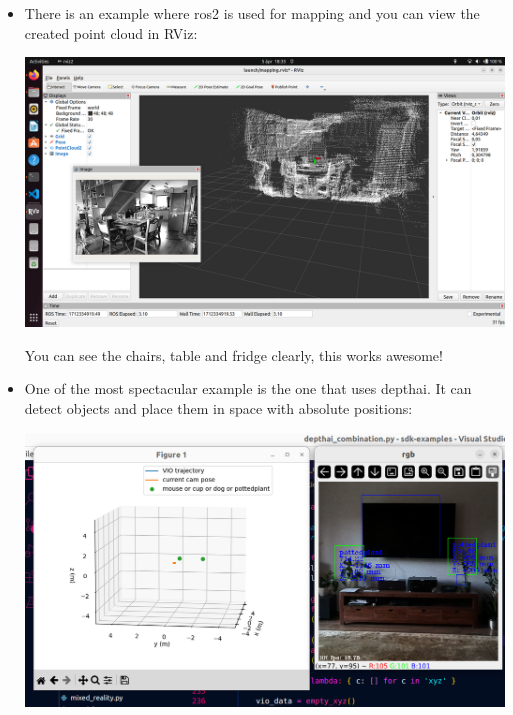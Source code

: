 \documentclass{article}
\begin{document}
\begin{itemize}
\begin{minipage}{\linewidth}
    \end{minipage}
    \par
    \item There is an example where ros2 is used for mapping and you can view the created point cloud in RViz:\par
    \begin{minipage}{\linewidth}
        \centering
        \includegraphics[width=1\linewidth]{spectacular_ai_mapping_ros2.png}
    \end{minipage}\par
    You can see the chairs, table and fridge clearly, this works awesome!
    \item One of the most spectacular example is the one that uses depthai. It can detect objects and place them in space with absolute positions:\par
    \begin{minipage}{\linewidth}
        \centering
        \includegraphics[width=1\linewidth]{images/spectacular_ai_depthai_combination.png}

\end{minipage}
\end{itemize}
\end{document}
